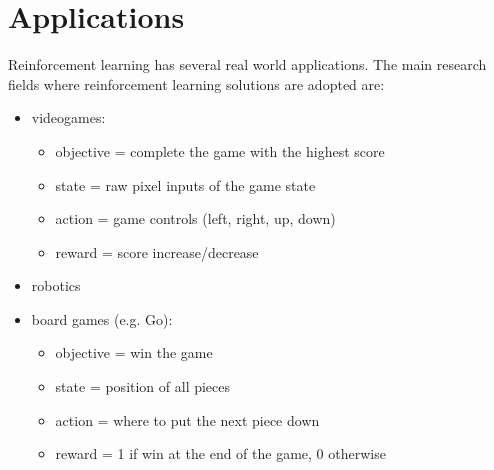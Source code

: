 \section{Applications}
Reinforcement learning has several real world applications. The main research fields where reinforcement learning solutions are adopted are:

\begin{itemize}
    \item videogames:
    \begin{itemize}
        \item objective = complete the game with the highest score
        \item state = raw pixel inputs of the game state
        \item action = game controls (left, right, up, down)
        \item reward = score increase/decrease
    \end{itemize}
    \item robotics
    \item board games (e.g. Go):
    \begin{itemize}
        \item objective = win the game
        \item state = position of all pieces
        \item action = where to put the next piece down
        \item reward = 1 if win at the end of the game, 0 otherwise
    \end{itemize}
\end{itemize}

